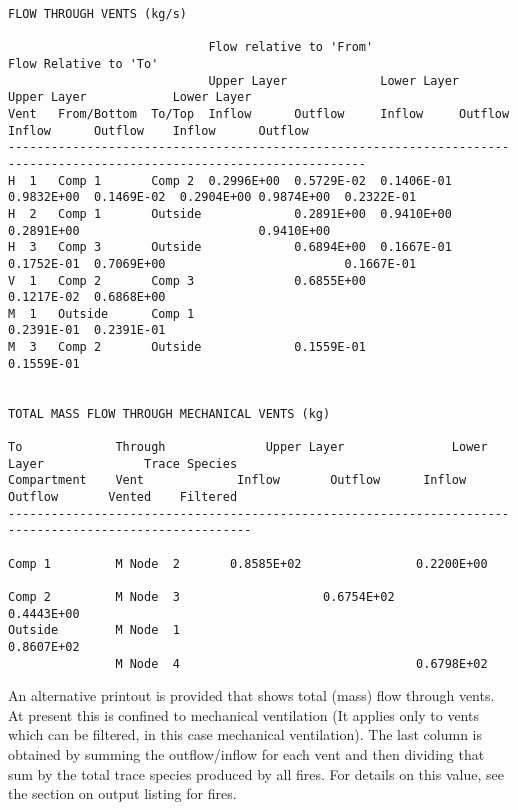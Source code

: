\begin{lstlisting}[basicstyle=\tiny]
FLOW THROUGH VENTS (kg/s)

                            Flow relative to 'From'                        Flow Relative to 'To'
                            Upper Layer             Lower Layer            Upper Layer            Lower Layer
Vent   From/Bottom  To/Top  Inflow      Outflow     Inflow     Outflow     Inflow      Outflow    Inflow      Outflow
------------------------------------------------------------------------------------------------------------------------
H  1   Comp 1       Comp 2  0.2996E+00  0.5729E-02  0.1406E-01 0.9832E+00  0.1469E-02  0.2904E+00 0.9874E+00  0.2322E-01
H  2   Comp 1       Outside             0.2891E+00  0.9410E+00             0.2891E+00                         0.9410E+00
H  3   Comp 3       Outside             0.6894E+00  0.1667E-01 0.1752E-01  0.7069E+00                         0.1667E-01
V  1   Comp 2       Comp 3              0.6855E+00             0.1217E-02  0.6868E+00
M  1   Outside      Comp 1                                     0.2391E-01  0.2391E-01
M  3   Comp 2       Outside             0.1559E-01                                                0.1559E-01


TOTAL MASS FLOW THROUGH MECHANICAL VENTS (kg)

To             Through              Upper Layer               Lower Layer              Trace Species
Compartment    Vent             Inflow       Outflow      Inflow       Outflow       Vented    Filtered
--------------------------------------------------------------------------------------------------------

Comp 1         M Node  2       0.8585E+02                0.2200E+00

Comp 2         M Node  3                    0.6754E+02                0.4443E+00
Outside        M Node  1                                              0.8607E+02
               M Node  4                                 0.6798E+02
\end{lstlisting}

An alternative printout is provided that shows total (mass) flow through vents. At present this is confined to mechanical ventilation (It applies only to vents which can be filtered, in this case mechanical ventilation). The last column is obtained by summing the outflow/inflow for each vent and then dividing that sum by the total trace species produced by all fires. For details on this value, see the section on output listing for fires.



